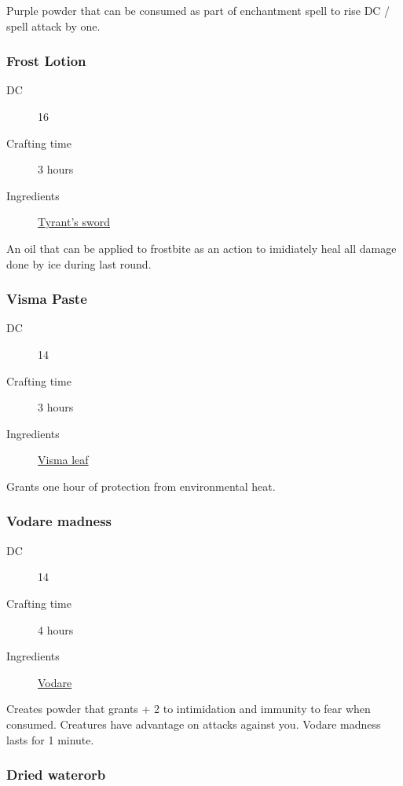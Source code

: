 Purple powder that can be consumed as part of enchantment spell to rise DC / spell attack by one.

\subsubsection{Frost Lotion}
\label{Frost Lotion}

\begin{description}
\item [DC] 16
\item [Crafting time] 3 hours
\item [Ingredients] \hyperref[Tyrant's Sword]{Tyrant's sword}
\end{description}

An oil that can be applied to frostbite as an action to imidiately heal all damage done by ice 
during last round.

\subsubsection{Visma Paste}
\label{Visma Paste}

\begin{description}
\item [DC] 14
\item [Crafting time] 3 hours
\item [Ingredients] \hyperref[Visma]{Visma leaf}
\end{description}

Grants one hour of protection from environmental heat.

\subsubsection{Vodare madness}
\label{Vodare madness}

\begin{description}
\item [DC] 14
\item [Crafting time] 4 hours
\item [Ingredients] \hyperref[Vodare]{Vodare}
\end{description}

Creates powder that grants + 2 to intimidation and immunity to fear when consumed. 
Creatures have advantage on attacks against you. Vodare madness lasts for 1 minute.

\subsubsection{Dried waterorb}
\label{Dried waterorb}

